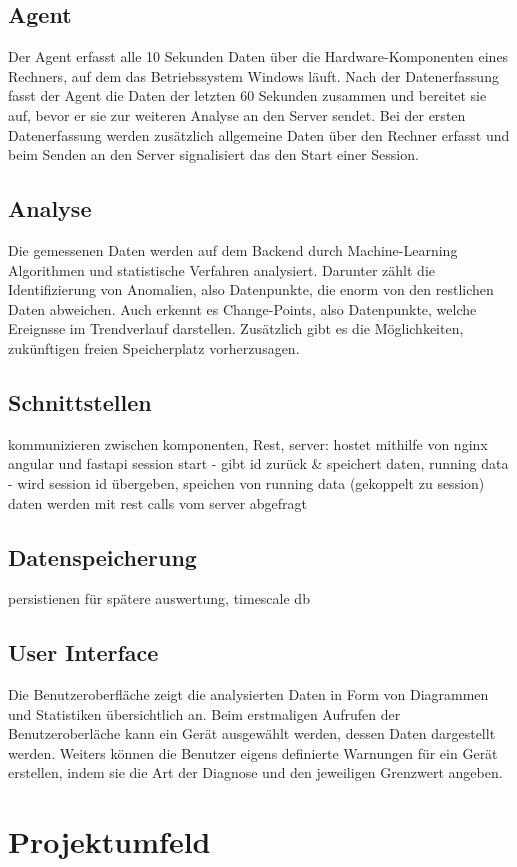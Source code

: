 \documentclass{report}
\begin{document}
\subsection{Agent}
Der Agent erfasst alle 10 Sekunden Daten über die Hardware-Komponenten eines Rechners, auf dem das Betriebssystem Windows läuft. Nach der Datenerfassung fasst der Agent die Daten der letzten 60 Sekunden zusammen und bereitet sie auf, bevor er sie zur weiteren Analyse an den Server sendet. Bei der ersten Datenerfassung werden zusätzlich allgemeine Daten über den Rechner erfasst und beim Senden an den Server signalisiert das den Start einer Session. 
\subsection{Analyse}
Die gemessenen Daten werden auf dem Backend durch Machine-Learning Algorithmen und statistische Verfahren analysiert. Darunter zählt die Identifizierung von Anomalien, also Datenpunkte, die enorm von den restlichen Daten abweichen. Auch erkennt es Change-Points, also Datenpunkte, welche Ereignsse im Trendverlauf darstellen. Zusätzlich gibt es die Möglichkeiten, zukünftigen freien Speicherplatz vorherzusagen.
\subsection{Schnittstellen}
kommunizieren zwischen komponenten, Rest, server: hostet mithilfe von nginx angular und fastapi
session start - gibt id zurück & speichert daten, running data - wird session id übergeben, speichen von running data (gekoppelt zu session)
daten werden mit rest calls vom server abgefragt
\subsection{Datenspeicherung}
persistienen für spätere auswertung, timescale db 
\subsection{User Interface}
Die Benutzeroberfläche zeigt die analysierten Daten in Form von Diagrammen und Statistiken übersichtlich an. Beim erstmaligen Aufrufen der Benutzeroberläche kann ein Gerät ausgewählt werden, dessen Daten dargestellt werden. Weiters können die Benutzer eigens definierte Warnungen für ein Gerät erstellen, indem sie die Art der Diagnose und den jeweiligen Grenzwert angeben.
\section{Projektumfeld}
\end{document}
